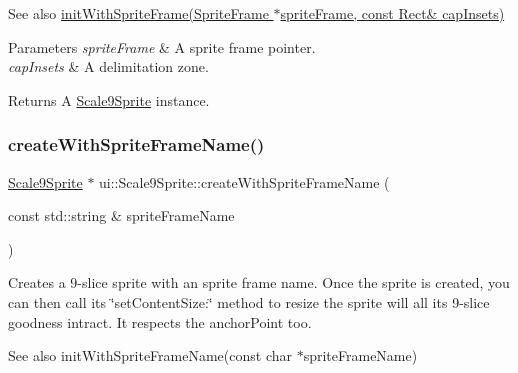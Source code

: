 \begin{DoxySeeAlso}{See also}
\hyperlink{classui_1_1Scale9Sprite_ade227fd72fa88fc071803260cac0d9b5}{init\+With\+Sprite\+Frame(\+Sprite\+Frame $\ast$sprite\+Frame, const Rect\& cap\+Insets)} 
\end{DoxySeeAlso}

\begin{DoxyParams}{Parameters}
{\em sprite\+Frame} & A sprite frame pointer. \\
\hline
{\em cap\+Insets} & A delimitation zone. \\
\hline
\end{DoxyParams}
\begin{DoxyReturn}{Returns}
A \hyperlink{classui_1_1Scale9Sprite}{Scale9\+Sprite} instance. 
\end{DoxyReturn}
\mbox{\label{classui_1_1Scale9Sprite_a0392b39e9e31cb2fe8d809039c83c50d}} 
\subsubsection{\texorpdfstring{create\+With\+Sprite\+Frame\+Name()}{createWithSpriteFrameName()}\hspace{0.1cm}{\footnotesize\ttfamily [1/4]}}
{\footnotesize\ttfamily \hyperlink{classui_1_1Scale9Sprite}{Scale9\+Sprite} $\ast$ ui\+::\+Scale9\+Sprite\+::create\+With\+Sprite\+Frame\+Name (\begin{DoxyParamCaption}\item[{const std\+::string \&}]{sprite\+Frame\+Name }\end{DoxyParamCaption})\hspace{0.3cm}{\ttfamily [static]}}

Creates a 9-\/slice sprite with an sprite frame name. Once the sprite is created, you can then call its \char`\"{}set\+Content\+Size\+:\char`\"{} method to resize the sprite will all it\textquotesingle{}s 9-\/slice goodness intract. It respects the anchor\+Point too.

\begin{DoxySeeAlso}{See also}
init\+With\+Sprite\+Frame\+Name(const char $\ast$sprite\+Frame\+Name) 
\end{DoxySeeAlso}

